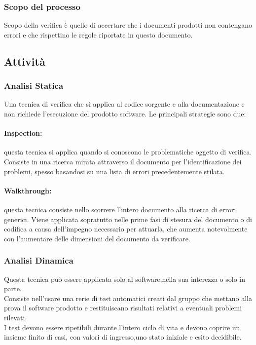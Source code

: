 \documentclass[../NormeDiProgetto.tex]{subfiles}
\begin{document}
		\subsubsection{Scopo del processo}
		Scopo della verifica è quello di accertare che i documenti prodotti non contengano errori e che rispettino le regole riportate in questo documento.
		
		\subsection{Attività}
		\subsubsection{Analisi Statica}Una tecnica di verifica che si applica al codice sorgente e alla documentazione e non richiede l'esecuzione del prodotto software. Le principali strategie sono due:
		\paragraph{Inspection:}	questa tecnica si applica quando si conoscono le problematiche oggetto di verifica. Consiste in una ricerca mirata attraverso il documento per l'identificazione dei problemi, spesso basandosi su una lista di errori precedentemente stilata.
		\paragraph{Walkthrough:} questa tecnica consiste nello scorrere l'intero documento alla ricerca di errori generici. Viene applicata sopratutto nelle prime fasi di stesura del documento o di codifica a causa dell'impegno necessario per attuarla, che aumenta notevolmente con l'aumentare delle dimensioni del documento da verificare.
		\subsubsection{Analisi Dinamica}
		Questa tecnica può essere applicata solo al software,nella sua interezza o solo in parte.\\ Consiste nell'usare una rerie di test automatici creati dal gruppo che mettano alla prova il software prodotto e restituiscano risultati relativi a eventuali problemi rilevati.\\
		I test devono essere ripetibili durante l'intero ciclo di vita e devono coprire un insieme finito di casi, con valori di ingresso,uno stato iniziale e esito decidibile.	
		
\end{document}
